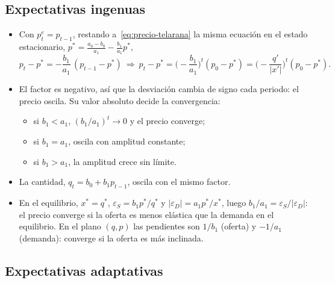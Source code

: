 \documentclass[11pt]{article}
\begin{document}
\subsection{Expectativas ingenuas}\label{anexo:expectativas-ingenuas}

\begin{itemize}
\item Con $p^e_t=p_{t-1}$, restando a~\eqref{eq:precio-telarana} la misma ecuación en el estado estacionario, $p^*=\frac{a_0-b_0}{a_1}-\frac{b_1}{a_1}p^*$,
  $$p_t-p^*=-\frac{b_1}{a_1}\,(p_{t-1}-p^*)\ \Longrightarrow\ p_t-p^*=\Big(-\frac{b_1}{a_1}\Big)^{t}(p_0-p^*)=\Big(-\frac{q'}{\lvert x'\rvert}\Big)^{t}(p_0-p^*).$$
\item El factor es negativo, así que la desviación cambia de signo cada periodo: el precio oscila. Su valor absoluto decide la convergencia:
  \begin{itemize}
  \item si $b_1<a_1$, $(b_1/a_1)^t\to 0$ y el precio converge;
  \item si $b_1=a_1$, oscila con amplitud constante;
  \item si $b_1>a_1$, la amplitud crece sin límite.
  \end{itemize}
\item La cantidad, $q_t=b_0+b_1p_{t-1}$, oscila con el mismo factor.
\item En el equilibrio, $x^*=q^*$, $\varepsilon_S=b_1p^*/q^*$ y $\lvert\varepsilon_D\rvert=a_1p^*/x^*$, luego $b_1/a_1=\varepsilon_S/\lvert\varepsilon_D\rvert$: el precio converge si la oferta es menos elástica que la demanda en el equilibrio. En el plano $(q,p)$ las pendientes son $1/b_1$ (oferta) y $-1/a_1$ (demanda): converge si la oferta es más inclinada.
\end{itemize}
\findemo

\subsection{Expectativas adaptativas}\label{anexo:expectativas-adaptativas}
\end{document}
